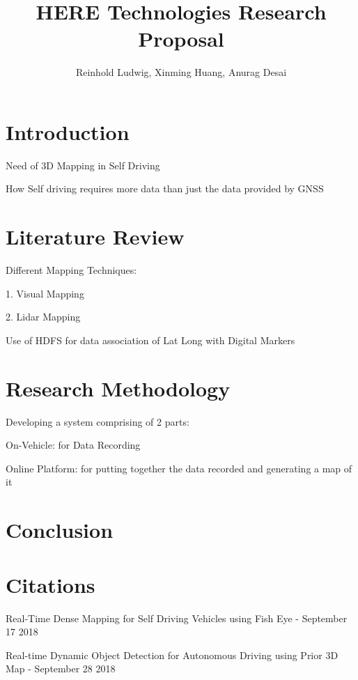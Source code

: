 \documentclass{article}
\begin{document}
	\title{HERE Technologies Research Proposal}
	\author{Reinhold Ludwig, Xinming Huang, Anurag Desai}
	\maketitle
	\begin{abstract}
		
	\end{abstract}
	\section{Introduction}
	
	Need of 3D Mapping in Self Driving 
	
	How Self driving requires more data than just the data provided by GNSS
	
	\section{Literature Review}

	Different Mapping Techniques:
	
	1. Visual Mapping
	
	2. Lidar Mapping
	
	Use of HDFS for data association of Lat Long with Digital Markers
	
	\section{Research Methodology}
	Developing a system comprising of 2 parts:
	
	On-Vehicle: for Data Recording
	
	Online Platform: for putting together the data recorded and generating a map of it
	
	\section{Conclusion}
	
	\section{Citations}
	Real-Time Dense Mapping for Self Driving Vehicles using Fish Eye - September 17 2018
	
	Real-time Dynamic Object Detection for Autonomous Driving using Prior 3D Map - September 28 2018
\end{document}
